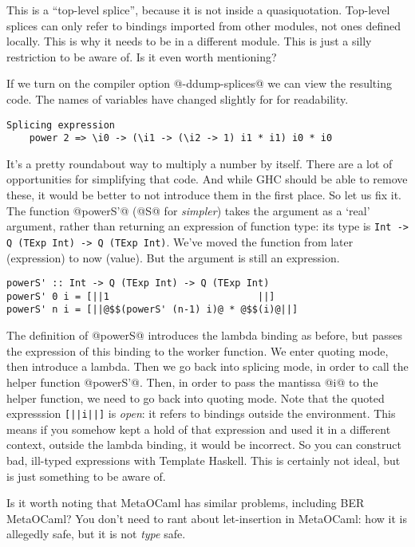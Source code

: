 This is a ``top-level splice'', because it is not inside a quasiquotation.
Top-level splices can only refer to bindings imported from other modules, not ones defined locally.
This is why it needs to be in a different module.
This is just a silly restriction to be aware of. Is it even worth mentioning?

If we turn on the compiler option @-ddump-splices@ we can view the resulting code.
The names of variables have changed slightly for for readability.

\begin{lstlisting}
Splicing expression
    power 2 => \i0 -> (\i1 -> (\i2 -> 1) i1 * i1) i0 * i0
\end{lstlisting}

It's a pretty roundabout way to multiply a number by itself. There are a lot of opportunities for simplifying that code. And while GHC should be able to remove these, it would be better to not introduce them in the first place.
So let us fix it.
The function @powerS'@ (@S@ for \emph{simpler}) takes the argument as a `real' argument, rather than returning an expression of function type: its type is \lstinline/Int -> Q (TExp Int) -> Q (TExp Int)/.
We've moved the function from later (expression) to now (value).
But the argument is still an expression.

\begin{lstlisting}
powerS' :: Int -> Q (TExp Int) -> Q (TExp Int)
powerS' 0 i = [||1                          ||]
powerS' n i = [||@$$(powerS' (n-1) i)@ * @$$(i)@||]
\end{lstlisting}

The definition of @powerS@ introduces the lambda binding as before, but passes the expression of this binding to the worker function.
We enter quoting mode, then introduce a lambda. Then we go back into splicing mode, in order to call the helper function @powerS'@.
Then, in order to pass the mantissa @i@ to the helper function, we need to go back into quoting mode.
Note that the quoted expresssion \lstinline/[||i||]/ is \emph{open}: it refers to bindings outside the environment.
This means if you somehow kept a hold of that expression and used it in a different context, outside the lambda binding, it would be incorrect.
So you can construct bad, ill-typed expressions with Template Haskell. This is certainly not ideal, but is just something to be aware of.

Is it worth noting that MetaOCaml has similar problems, including BER MetaOCaml?
You don't need to rant about let-insertion in MetaOCaml: how it is allegedly safe, but it is not \emph{type} safe.

